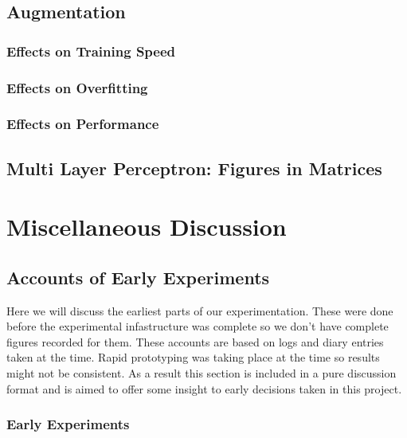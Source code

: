 \subsection{Augmentation}
\subsubsection{Effects on Training Speed}
\subsubsection{Effects on Overfitting}
\subsubsection{Effects on Performance}

\subsection{Multi Layer Perceptron: Figures in Matrices}

\section{Miscellaneous Discussion}
\subsection{Accounts of Early Experiments}
Here we will discuss the earliest parts of our experimentation. These were done before the experimental infastructure was complete so we don't have complete figures recorded for them. These accounts are based on logs and diary entries taken at the time. Rapid prototyping was taking place at the time so results might not be consistent. As a result this section is included in a pure discussion format and is aimed to offer some insight to early decisions taken in this project.

\subsubsection{Early Experiments}

